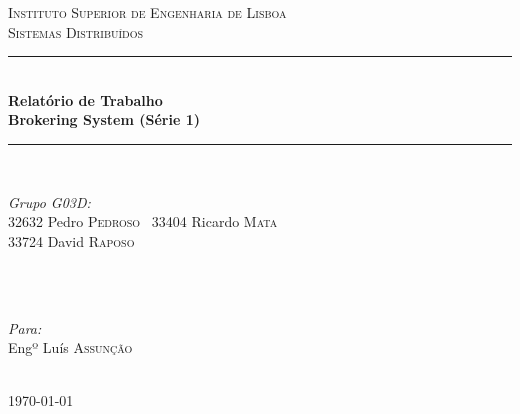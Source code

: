 \documentclass[a4paper]{article}
\begin{document}
\begin{titlepage}

\newcommand{\HRule}{\rule{\linewidth}{0.5mm}} %

\center %
 

\textsc{\LARGE Instituto Superior de Engenharia de Lisboa}\\[1.5cm] %
\textsc{\Large Sistemas Distribuídos}\\[0.5cm] %


\HRule \\[0.4cm]
{ \huge \bfseries Relatório de Trabalho}\\[0.4cm] %
{ \Large \bfseries Brokering System (Série 1)}\\
\HRule \\[1.5cm]
 

\begin{minipage}{0.4\textwidth}
\begin{flushleft} \large
\emph{Grupo G03D:}\\
32632 Pedro \textsc{Pedroso} \
33404 Ricardo \textsc{Mata} \\
33724 David \textsc{Raposo} \\

\
\end{flushleft}
\end{minipage}
~
\begin{minipage}{0.4\textwidth}
\begin{flushright} \large
\emph{Para:} \\
Engº Luís \textsc{Assunção} \\
\end{flushright}
\end{minipage}\\[4cm]

{\large \today}\\[3cm] %

\vfill %

\end{titlepage}
\end{document}
